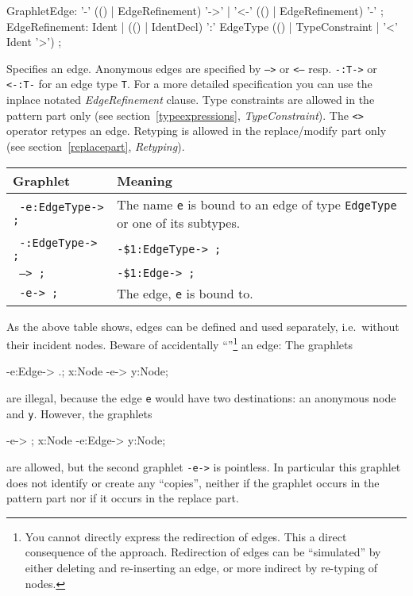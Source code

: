 \begin{rail}
  GraphletEdge: '-' (() | EdgeRefinement) '->'  | '<-' (() | EdgeRefinement) '-' ;
  EdgeRefinement: Ident | (() | IdentDecl) ':' EdgeType (() | TypeConstraint | '<' Ident '>') ;
\end{rail}
Specifies an edge. Anonymous edges are specified by \texttt{-->} or \texttt{<--} resp. \texttt{-:T->} or \texttt{<-:T-} for an edge type \texttt{T}. For a more detailed specification you can use the inplace notated \emph{EdgeRefinement} clause. Type constraints are allowed in the pattern part only (see section~\ref{typeexpressions}, \emph{TypeConstraint}). The \texttt{<>} operator retypes an edge. Retyping is allowed in the replace/modify part only (see section~\ref{replacepart}, \emph{Retyping}).\\
\begin{center}
  \begin{tabularx}{\linewidth}{lX}
    \textbf{Graphlet} & \textbf{Meaning}\\ \hline
    \texttt{ -e:EdgeType-> ;} & The name \texttt{e} is bound to an edge of type \texttt{EdgeType} or one of its subtypes. \\
    \texttt{ -:EdgeType-> ;} & \texttt{-\$1:EdgeType-> ;} \\
    \texttt{ --> ;} & \texttt{-\$1:Edge-> ;} \\
    \texttt{ -e-> ;} & The edge, \texttt{e} is bound to.
  \end{tabularx}
\end{center} 
As the above table shows, edges can be defined and used separately, i.e.\ without their incident nodes. Beware of accidentally ``''\footnote{You cannot directly express the redirection of edges. This a direct consequence of the  approach. Redirection of edges can be ``simulated'' by either deleting and re-inserting an edge, or more indirect by re-typing of nodes.} an edge: 
The graphlets
\begin{grgenlet}
-e:Edge-> .;
x:Node -e-> y:Node;
\end{grgenlet}
are illegal, because the edge \texttt{e} would have two destinations: an anonymous node and \texttt{y}.
However, the graphlets
\begin{grgenlet}
-e-> ;
x:Node -e:Edge-> y:Node;
\end{grgenlet}
are allowed, but the second graphlet \texttt{-e->} is pointless. In particular this graphlet does not identify or create any ``copies'', neither if the graphlet occurs in the pattern part nor if it occurs in the replace part.
